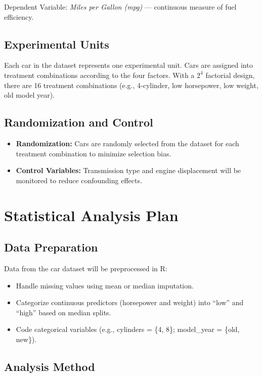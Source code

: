 \documentclass[12pt]{article}
\begin{document}
Dependent Variable: \textit{Miles per Gallon (mpg)} — continuous measure of fuel efficiency.

\subsection{Experimental Units}

Each car in the dataset represents one experimental unit. Cars are assigned into treatment combinations according to the four factors. With a $2^4$ factorial design, there are 16 treatment combinations (e.g., 4-cylinder, low horsepower, low weight, old model year).

\subsection{Randomization and Control}

\begin{itemize}
    \item \textbf{Randomization:} Cars are randomly selected from the dataset for each treatment combination to minimize selection bias.
    \item \textbf{Control Variables:} Transmission type and engine displacement will be monitored to reduce confounding effects.
\end{itemize}

\section{Statistical Analysis Plan}

\subsection{Data Preparation}

Data from the car dataset will be preprocessed in \textsf{R}:

\begin{itemize}
    \item Handle missing values using mean or median imputation.
    \item Categorize continuous predictors (horsepower and weight) into “low” and “high” based on median splits.
    \item Code categorical variables (e.g., cylinders = \{4, 8\}; model\_year = \{old, new\}).
\end{itemize}

\subsection{Analysis Method}
\end{document}

